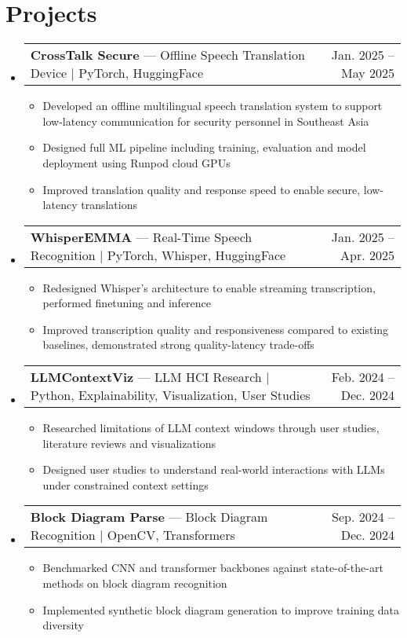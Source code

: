 \documentclass[letterpaper,11pt]{article}
\makeatletter
\newcommand{\resumeItem}[1]{
  \item\small{
    {#1 \vspace{-2pt}}
  }
}
\newcommand{\resumeProjectHeading}[2]{
    \item
    \begin{tabular*}{0.97\textwidth}{l@{\extracolsep{\fill}}r}
      \small#1 & \textnormal{\small #2} \\
    \end{tabular*}\vspace{-7pt}
}
\newcommand{\resumeSubHeadingListStart}{\begin{itemize}[leftmargin=0.15in, label={}]}
\newcommand{\resumeSubHeadingListEnd}{\end{itemize}}
\newcommand{\resumeItemListStart}{\begin{itemize}}
\newcommand{\resumeItemListEnd}{\end{itemize}\vspace{-5pt}}
\makeatother
\begin{document}
\section{Projects}
    \resumeSubHeadingListStart
      \resumeProjectHeading
          {\textbf{CrossTalk Secure} --- Offline Speech Translation Device $|$ PyTorch, HuggingFace}{Jan. 2025 -- May 2025}
          \resumeItemListStart
            \resumeItem{Developed an offline multilingual speech translation system to support low-latency communication for security personnel in Southeast Asia}
            \resumeItem{Designed full ML pipeline including training, evaluation and model deployment using Runpod cloud GPUs}
            \resumeItem{Improved translation quality and response speed to enable secure, low-latency translations}
          \resumeItemListEnd

      \resumeProjectHeading
          {\textbf{WhisperEMMA} --- Real-Time Speech Recognition $|$ PyTorch, Whisper, HuggingFace}{Jan. 2025 -- Apr. 2025}
          \resumeItemListStart
            \resumeItem{Redesigned Whisper's architecture to enable streaming transcription, performed finetuning and inference}
            \resumeItem{Improved transcription quality and responsiveness compared to existing baselines, demonstrated strong quality-latency trade-offs}
          \resumeItemListEnd
    
      \resumeProjectHeading
          {\textbf{LLMContextViz} --- LLM HCI Research $|$ Python, Explainability, Visualization, User Studies}{Feb. 2024 -- Dec. 2024}
          \resumeItemListStart
            \resumeItem{Researched limitations of LLM context windows through user studies, literature reviews and visualizations}
            \resumeItem{Designed user studies to understand real-world interactions with LLMs under constrained context settings}
          \resumeItemListEnd

      \resumeProjectHeading
          {\textbf{Block Diagram Parse} --- Block Diagram Recognition $|$ OpenCV, Transformers}{Sep. 2024 -- Dec. 2024}
          \resumeItemListStart
            \resumeItem{Benchmarked CNN and transformer backbones against state-of-the-art methods on block diagram recognition}
            \resumeItem{Implemented synthetic block diagram generation to improve training data diversity}
          \resumeItemListEnd

    \resumeSubHeadingListEnd

\end{document}
